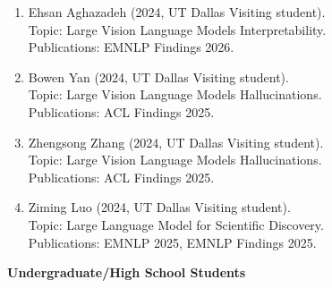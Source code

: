 \begin{enumerate}[label={},leftmargin=15pt]
\vspace{0.3mm}
\item Ehsan Aghazadeh (2024, UT Dallas Visiting student). \\
Topic: Large Vision Language Models Interpretability. \\
Publications: EMNLP Findings 2026.

\vspace{0.3mm}
\item Bowen Yan (2024, UT Dallas Visiting student). \\
Topic: Large Vision Language Models Hallucinations. \\
Publications: ACL Findings 2025.

\vspace{0.3mm}
\item Zhengsong Zhang (2024, UT Dallas Visiting student). \\
Topic: Large Vision Language Models Hallucinations. \\
Publications: ACL Findings 2025.

\vspace{0.3mm}
\item Ziming Luo (2024, UT Dallas Visiting student). \\
Topic: Large Language Model for Scientific Discovery. \\
Publications: EMNLP 2025, EMNLP Findings 2025.

\end{enumerate}


\noindent \textbf{Undergraduate/High School Students}

